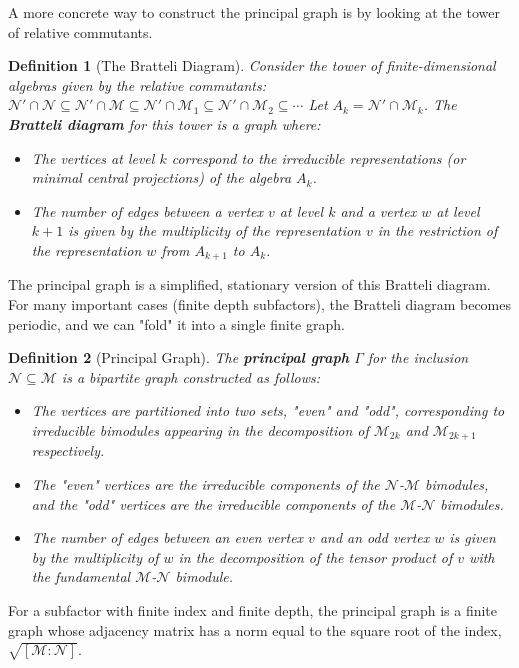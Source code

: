 \documentclass[11pt, a4paper]{article}
\theoremstyle{colored_def}
\newtheorem{definition}{Definition}[section]
\theoremstyle{colored_thm}
\theoremstyle{colored_ex}
\newcommand{\M}{\mathcal{M}}
\newcommand{\N}{\mathcal{N}}
\begin{document}
A more concrete way to construct the principal graph is by looking at the tower of relative commutants.

\begin{definition}[The Bratteli Diagram]
Consider the tower of finite-dimensional algebras given by the relative commutants:
$ \N' \cap \N \subseteq \N' \cap \M \subseteq \N' \cap \M_1 \subseteq \N' \cap \M_2 \subseteq \cdots $
Let $A_k = \N' \cap \M_k$. The \textbf{Bratteli diagram} for this tower is a graph where:
\begin{itemize}
    \item The vertices at level $k$ correspond to the irreducible representations (or minimal central projections) of the algebra $A_k$.
    \item The number of edges between a vertex $v$ at level $k$ and a vertex $w$ at level $k+1$ is given by the multiplicity of the representation $v$ in the restriction of the representation $w$ from $A_{k+1}$ to $A_k$.
\end{itemize}
\end{definition}

The principal graph is a simplified, stationary version of this Bratteli diagram. For many important cases (finite depth subfactors), the Bratteli diagram becomes periodic, and we can "fold" it into a single finite graph.

\begin{definition}[Principal Graph]
The \textbf{principal graph} $\Gamma$ for the inclusion $\N \subseteq \M$ is a bipartite graph constructed as follows:
\begin{itemize}
    \item The vertices are partitioned into two sets, "even" and "odd", corresponding to irreducible bimodules appearing in the decomposition of $\M_{2k}$ and $\M_{2k+1}$ respectively.
    \item The "even" vertices are the irreducible components of the $\N$-$\M$ bimodules, and the "odd" vertices are the irreducible components of the $\M$-$\N$ bimodules.
    \item The number of edges between an even vertex $v$ and an odd vertex $w$ is given by the multiplicity of $w$ in the decomposition of the tensor product of $v$ with the fundamental $\M$-$\N$ bimodule.
\end{itemize}
\end{definition}

For a subfactor with finite index and finite depth, the principal graph is a finite graph whose adjacency matrix has a norm equal to the square root of the index, $\sqrt{[\M:\N]}$.
\end{document}
